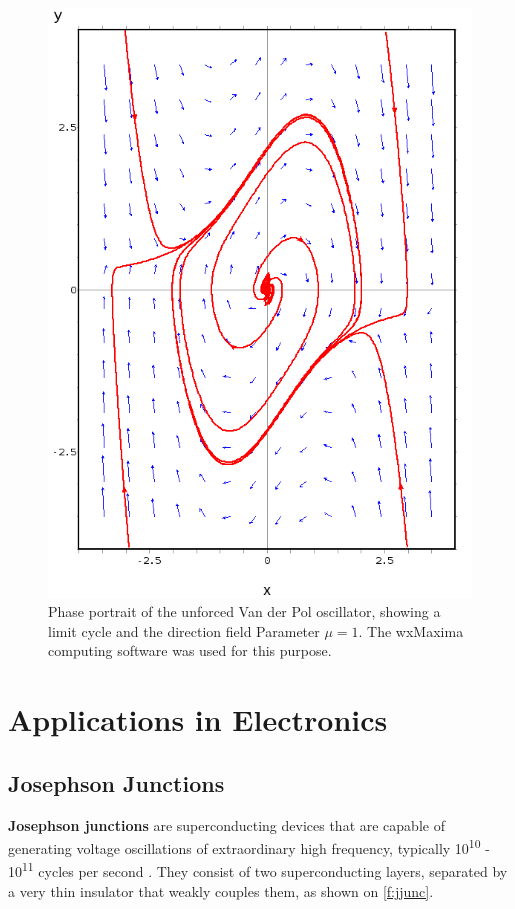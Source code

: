 \documentclass[journal]{IEEEtran}
\begin{document}
\begin{figure}[ht!]
	\centering
	\includegraphics[width=.85\linewidth]{vdp_maxima}
	\caption{Phase portrait of the unforced Van der Pol oscillator, showing a limit cycle and the direction field Parameter $\mu=1$. The wxMaxima computing software was used for this purpose. }
	\label{f:vdp_m}
\end{figure}


\section{Applications in Electronics}



\subsection{Josephson Junctions}
\textbf{Josephson junctions} are superconducting devices that are capable of generating voltage oscillations of extraordinary high frequency, typically 10\textsuperscript{10} - 10\textsuperscript{11} cycles per second \cite{van1981principles}. They consist of two superconducting layers, separated by a very thin insulator that weakly couples them, as shown on \cref{f:jjunc}.
\end{document}
